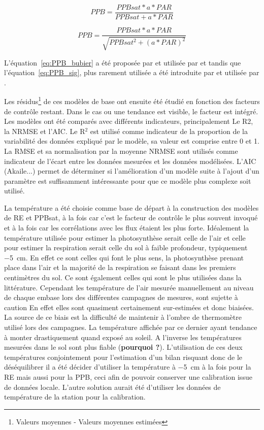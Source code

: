 \begin{equation} \label{eq:PPB_bubier}
PPB = \frac{PPBsat * a * PAR}{PPBsat + a * PAR}
\end{equation}

\begin{equation} \label{eq:PPB_sig}
PPB = \frac{PPBsat * a * PAR}{\sqrt{PPBsat^2 + (a * PAR)^2}}
\end{equation}

L'équation~\ref{eq:PPB_bubier} a été proposée par \cite{bubier1998} et utilisée par \cite{bortoluzzi2006,worrall2009} et tandis que l'équation~\ref{eq:PPB_sig}, plus rarement utilisée a été introduite par \cite{smith1937} et utilisée par \cite{wohlfahrt2010,gorres2014}.

Les résidus\footnote{Valeurs moyennes - Valeurs moyennes estimées} de ces modèles de base ont ensuite été étudié en fonction des facteurs de contrôle restant.
Dans le cas ou une tendance est visible, le facteur est intégré.
Les modèles ont été comparés avec différents indicateurs, principalement Le R2, la NRMSE et l'AIC.
Le R$^{2}$ est utilisé comme indicateur de la proportion de la variabilité des données expliqué par le modèle, sa valeur est comprise entre 0 et 1.
La RMSE et sa normalisation par la moyenne NRMSE sont utilisés comme indicateur de l'écart entre les données mesurées et les données modélisées.
L'AIC (Akaile...) permet de déterminer si l'amélioration d'un modèle suite à l'ajout d'un paramètre est suffisamment intéressante pour que ce modèle plus complexe soit utilisé.

La température a été choisie comme base de départ à la construction des modèles de RE et PPBsat, à la fois car c'est le facteur de contrôle le plus souvent invoqué et à la fois car les corrélations avec les flux étaient les plus forte.
Idéalement la température utilisée pour estimer la photosynthèse serait celle de l'air et celle pour estimer la respiration serait celle du sol à faible profondeur, typiquement \SI{-5}{\centi\metre}.
En effet ce sont celles qui font le plus sens, la photosynthèse prenant place dans l'air et la majorité de la respiration se faisant dans les premiers centimètres du sol.
Ce sont également celles qui sont le plus utilisées dans la littérature.
Cependant les température de l'air mesurée manuellement au niveau de chaque embase lors des différentes campagnes de mesures, sont sujette à caution 
En effet elles sont quasiment certainement sur-estimées et donc biaisées.
La source de ce biais est la difficulté de maintenir à l'ombre de thermomètre utilisé lors des campagnes.
La température affichée par ce dernier ayant tendance à monter drastiquement quand exposé au soleil.
A l'inverse les températures mesurées dans le sol sont plus fiable (\textbf{pourquoi ?}).
L'utilisation de ces deux températures conjointement pour l'estimation d'un bilan risquant donc de le déséquilibrer il a été décider d'utiliser la température à \SI{-5}{\centi\metre} à la fois pour la RE mais aussi pour la PPB, ceci afin de pouvoir conserver une calibration issue de données locale.
L'autre solution aurait été d'utiliser les données de température de la station pour la calibration.

